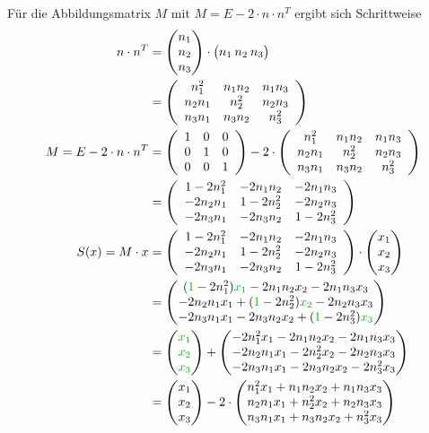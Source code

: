 \documentclass[main.tex]{subfiles}
\begin{document}
Für die Abbildungsmatrix $M$ mit $M=E -2\cdot n\cdot n^T$ ergibt sich Schrittweise
\begin{align*}
    n\cdot n^T &= \vektor{n_1 \\ n_2 \\ n_3} \cdot \vektor{n_1 & n_2 & n_3} \\
               &= \eqmatrix{ccc}{
                    n_1^2   & n_1 n_2 & n_1 n_3 \\
                    n_2 n_1 & n_2^2   & n_2 n_3 \\
                    n_3 n_1 & n_3 n_2 & n_3^2
                }\\
    M = E -2\cdot n\cdot n^T &= \eqmatrix{ccc}{1 & 0 & 0 \\ 0 & 1 & 0 \\ 0 & 0 & 1} - 2\cdot \eqmatrix{ccc}{
        n_1^2   & n_1 n_2 & n_1 n_3 \\
        n_2 n_1 & n_2^2   & n_2 n_3 \\
        n_3 n_1 & n_3 n_2 & n_3^2
    }\\
        &= \eqmatrix{ccc}{
            1-2 n_1^2   & -2 n_1 n_2 & -2 n_1 n_3 \\
            -2 n_2 n_1 & 1-2 n_2^2   & -2 n_2 n_3 \\
            -2 n_3 n_1 & -2 n_3 n_2 & 1-2 n_3^2
        }\\
    S(x)=M\cdot x &= \eqmatrix{ccc}{
        1-2 n_1^2   & -2 n_1 n_2 & -2 n_1 n_3 \\
        -2 n_2 n_1 & 1-2 n_2^2   & -2 n_2 n_3 \\
        -2 n_3 n_1 & -2 n_3 n_2 & 1-2 n_3^2
    } \cdot \vektor{x_1 \\ x_2 \\ x_3}\\
     &= \vektor{
        (\textcolor{gruen}{1}-2 n_1^2) \textcolor{gruen}{x_1} - 2 n_1 n_2  x_2 - 2 n_1 n_3  x_3\\
        -2 n_2 n_1  x_1 + (\textcolor{gruen}{1}-2 n_2^2) \textcolor{gruen}{x_2} - 2 n_2 n_3  x_3\\
        -2 n_3 n_1  x_1 - 2 n_3 n_2  x_2 + (\textcolor{gruen}{1}-2 n_3^2) \textcolor{gruen}{x_3}
    }\\
    &= \vektor{\textcolor{gruen}{x_1} \\ \textcolor{gruen}{x_2} \\ \textcolor{gruen}{x_3}} + \vektor{
        -2 n_1^2    x_1 -2 n_1 n_2  x_2 -2 n_1 n_3  x_3\\
        -2 n_2 n_1  x_1 -2 n_2^2    x_2 -2 n_2 n_3  x_3\\
        -2 n_3 n_1  x_1 -2 n_3 n_2  x_2 -2 n_3^2    x_3
    }\\
    &= \vektor{x_1 \\ x_2 \\ x_3} - 2\cdot \vektor{
        n_1^2    x_1 + n_1 n_2  x_2 + n_1 n_3  x_3\\
        n_2 n_1  x_1 + n_2^2    x_2 + n_2 n_3  x_3\\
        n_3 n_1  x_1 + n_3 n_2  x_2 + n_3^2    x_3
    }
\end{align*}
\end{document}
